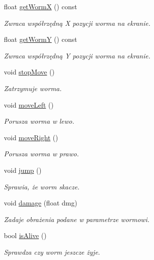 \begin{DoxyCompactItemize}
float \mbox{\hyperlink{class_worm_a9787181c41ca3a4ac5098277e8a4a142}{get\+WormX}} () const
\begin{DoxyCompactList}\small\item\em Zwraca współrzędną X pozycji worma na ekranie. \end{DoxyCompactList}\item 
float \mbox{\hyperlink{class_worm_aa1a5e5334f8d3e339f15b36a9af31f27}{get\+WormY}} () const
\begin{DoxyCompactList}\small\item\em Zwraca współrzędną Y pozycji worma na ekranie. \end{DoxyCompactList}\item 
void \mbox{\hyperlink{class_worm_a1cdb0c544127417ba4b95fd8e5d3f9fc}{stop\+Move}} ()
\begin{DoxyCompactList}\small\item\em Zatrzymuje worma. \end{DoxyCompactList}\item 
void \mbox{\hyperlink{class_worm_a93d02457a10bbbfc1d2028168419ecb8}{move\+Left}} ()
\begin{DoxyCompactList}\small\item\em Porusza worma w lewo. \end{DoxyCompactList}\item 
void \mbox{\hyperlink{class_worm_a6d4b33910c18b0e266e310d9b5512d75}{move\+Right}} ()
\begin{DoxyCompactList}\small\item\em Porusza worma w prawo. \end{DoxyCompactList}\item 
void \mbox{\hyperlink{class_worm_ae4cd763e0edd18cecab42b39142cea14}{jump}} ()
\begin{DoxyCompactList}\small\item\em Sprawia, że worm skacze. \end{DoxyCompactList}\item 
void \mbox{\hyperlink{class_worm_aa57fe22ce4031e5332d16d709e7274c8}{damage}} (float dmg)
\begin{DoxyCompactList}\small\item\em Zadaje obrażenia podane w parametrze wormowi. \end{DoxyCompactList}\item 
bool \mbox{\hyperlink{class_worm_a606868b7856598eef50b8ebcd2374927}{is\+Alive}} ()
\begin{DoxyCompactList}\small\item\em Sprawdza czy worm jeszcze żyje. \end{DoxyCompactList}\item 

\end{DoxyCompactItemize}
